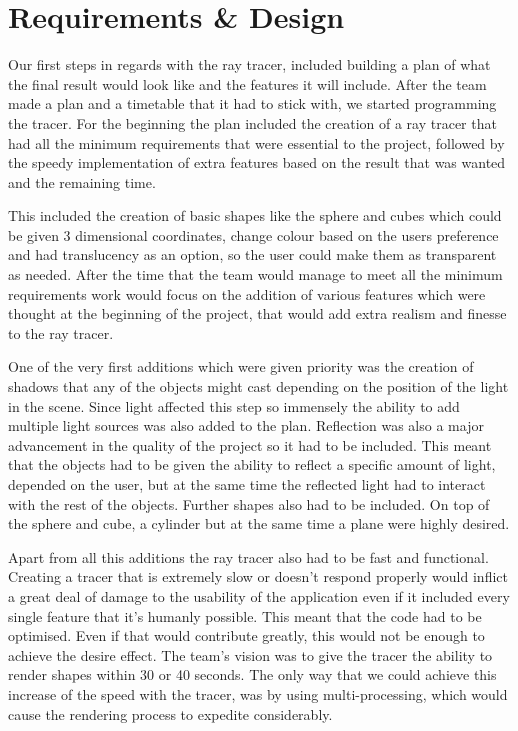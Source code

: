 \documentclass[10pt]{scrartcl}
\begin{document}
\section{Requirements \& Design}
Our first steps in regards with the ray tracer, included building a plan of what the final result would look like and the features it will include. After the team made a plan and a timetable that it had to stick with, we started programming the tracer. For the beginning the plan included the creation of a ray tracer that had all the minimum requirements that were essential to the project, followed by the speedy implementation of extra features based on the result that was wanted and the remaining time. \par
This included the creation of basic shapes like the sphere and cubes which could be given 3 dimensional coordinates, change colour based on the users preference and had translucency as an option, so the user could make them as transparent as needed. After the time that the team would manage to meet all the minimum requirements work would focus on the addition of various features which were thought at the beginning of the project, that would add extra realism and finesse to the ray tracer. \par
One of the very first additions which were given priority was the creation of shadows that any of the objects might cast depending on the position of the light in the scene. Since light affected this step so immensely the ability to add multiple light sources was also added to the plan. Reflection was also a major advancement in the quality of the project so it had to be included. This meant that the objects had to be given the ability to reflect a specific amount of light, depended on the user, but at the same time the reflected light had to interact with the rest of the objects. Further shapes also had to be included. On top of the sphere and cube, a cylinder but at the same time a plane were highly desired. \par
Apart from all this additions the ray tracer also had to be fast and functional. Creating a tracer that is extremely slow or doesn’t respond properly would inflict a great deal of damage to the usability of the application even if it included every single feature that it’s humanly possible. This meant that the code had to be optimised. Even if that would contribute greatly, this would not be enough to achieve the desire effect. The team’s vision was to give the tracer the ability to render shapes within 30 or 40 seconds. The only way that we could achieve this increase of the speed with the tracer, was by using multi-processing, which would cause the rendering process to expedite considerably.\par
\end{document}
